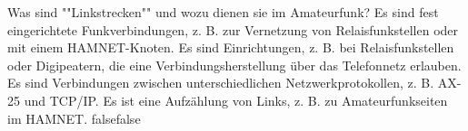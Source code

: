     {Was sind ""Linkstrecken"" und wozu dienen sie im Amateurfunk?}
    {Es sind fest eingerichtete Funkverbindungen, z. B. zur Vernetzung von Relaisfunkstellen oder mit einem HAMNET-Knoten.}
    {Es sind Einrichtungen, z. B. bei Relaisfunkstellen oder Digipeatern, die eine Verbindungsherstellung über das Telefonnetz erlauben.}
    {Es sind Verbindungen zwischen unterschiedlichen Netzwerkprotokollen, z. B. AX-25 und TCP/IP.}
    {Es ist eine Aufzählung von Links, z. B. zu Amateurfunkseiten im HAMNET.}
    {false}{false}